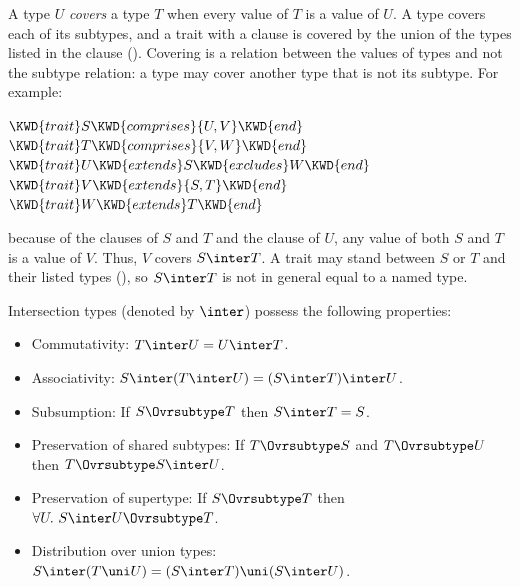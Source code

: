A type $U$ \emph{covers} a type $T$ when every value of $T$ is a value of $U$.
A type covers each of its subtypes, and a trait with a  clause
is covered by the union of the types listed in the clause
().
Covering is a relation between the values of types and not the subtype
relation: a type may cover another type that is not its subtype.
For example:
\begin{Fortress}
\(\KWD{trait} S \KWD{comprises} \{U,V\} \KWD{end}\)\\
\(\KWD{trait} T \KWD{comprises} \{V,W\} \KWD{end}\)\\
\(\KWD{trait} U \KWD{extends} S \KWD{excludes} W \KWD{end}\)\\
\(\KWD{trait} V \KWD{extends} \{S,T\} \KWD{end}\)\\
\(\KWD{trait} W \KWD{extends} T \KWD{end}\)
\end{Fortress}
because of the  clauses of $S$ and $T$ and the 
clause of $U$, any value of both $S$ and $T$ is a value of
$V$.  Thus, $V$ covers $S \inter T$.
A trait may stand between $S$ or $T$ and their listed types
(), so $S \inter T$ is not in general equal to a named
type.


Intersection types (denoted by $\inter$) possess the following properties:
\begin{itemize}
\item Commutativity: $T \inter U = U \inter T$.
\item Associativity: $S \inter (T \inter U) = (S \inter T) \inter U$.
\item Subsumption: If $S \Ovrsubtype T$ then $S \inter T = S$.
\item Preservation of shared subtypes: If $T \Ovrsubtype S$ and $T \Ovrsubtype U$ then $T \Ovrsubtype S \inter U$.
\item Preservation of supertype: If $S \Ovrsubtype T$ then $\forall U.~S \inter U \Ovrsubtype T$.
\item Distribution over union types: $S \inter (T \uni U) =
  (S \inter T) \uni (S \inter U)$.
\end{itemize}

